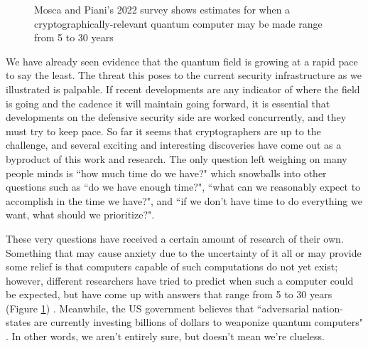 \begin{figure}[h] \centering
        {
            \captionsetup{justification=centering}
            \caption{Mosca and Piani's 2022 survey shows estimates for when a cryptographically-relevant quantum computer may be made range from 5 to 30 years} \label{fig:mosca_piani}
        }
\end{figure}

We have already seen evidence that the quantum field is growing at a rapid pace to say the least. The threat this poses to the current security infrastructure as we illustrated is palpable. If recent developments are any indicator of where the field is going and the cadence it will maintain going forward, it is essential that developments on the defensive security side are worked concurrently, and they must try to keep pace. So far it seems that cryptographers are up to the challenge, and several exciting and interesting discoveries have come out as a byproduct of this work and research. The only question left weighing on many people minds is ``how much time do we have?" which snowballs into other questions such as ``do we have enough time?", ``what can we reasonably expect to accomplish in the time we have?", and ``if we don't have time to do everything we want, what should we prioritize?".

These very questions have received a certain amount of research of their own. Something that may cause anxiety due to the uncertainty of it all or may provide some relief is that computers capable of such computations do not yet exist; however, different researchers have tried to predict when such a computer could be expected, but have come up with answers that range from 5 to 30 years (Figure \ref{fig:mosca_piani}) \cite{mosca_piani_howsoon}. Meanwhile, the US government believes that ``adversarial nation-states are currently investing billions of dollars to weaponize quantum computers" \cite{2022_nsa}. In other words, we aren't entirely sure, but doesn't mean we're clueless. 

